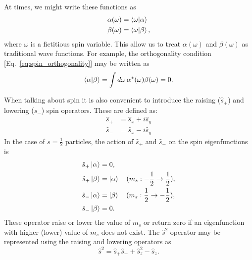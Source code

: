 \documentclass[../Main/chem532-notes.tex]{subfiles}
\begin{document}
At times, we might write these functions as
\begin{align}
\alpha(\omega) &= \braket{\omega|\alpha} \\
\beta(\omega) &= \braket{\omega|\beta},
\end{align}
where $\omega$ is a fictitious spin variable. This allow us to treat $\alpha(\omega)$ and $\beta(\omega)$ as traditional wave functions. For example, the orthogonality condition [Eq.~\eqref{eq:spin_orthogonality}] may be written as
\begin{equation}
\braket{\alpha | \beta} = \int d\omega \, \alpha^*(\omega) \beta(\omega)  = 0.
\end{equation}

When talking about spin it is also convenient to introduce the raising ($\hat{s}_{+}$) and lowering ($\hat{s}_{-}$) spin operators.
These are defined as:
\begin{align}
\hat{s}_{+} & = \hat{s}_{x} + i \hat{s}_{y} \\
\hat{s}_{-} & = \hat{s}_{x} - i \hat{s}_{y}  
\end{align}
In the case of $s = \frac{1}{2}$ particles, the action of $\hat{s}_{+}$ and $\hat{s}_{-}$ on the spin eigenfunctions is
\begin{align}
\hat{s}_{+} \ket{\alpha} &= 0, \\
\hat{s}_{+} \ket{\beta} &= \ket{\alpha} \quad (m_s: -\frac{1}{2} \rightarrow \frac{1}{2}),\\
\hat{s}_{-} \ket{\alpha} &= \ket{\beta} \quad (m_s: \frac{1}{2} \rightarrow -\frac{1}{2}),\\
\hat{s}_{-} \ket{\beta} &= 0.
\end{align}
These operator raise or lower the value of $m_s$ or return zero if an eigenfunction with higher (lower) value of $m_s$ does not exist.
The $\hat{s}^2$ operator may be represented using the raising and lowering operators as
\begin{equation}
\hat{s}^2 = \hat{s}_{+}\hat{s}_{-} + \hat{s}^{2}_{z} - \hat{s}_{z}.
\end{equation}
\end{document}

